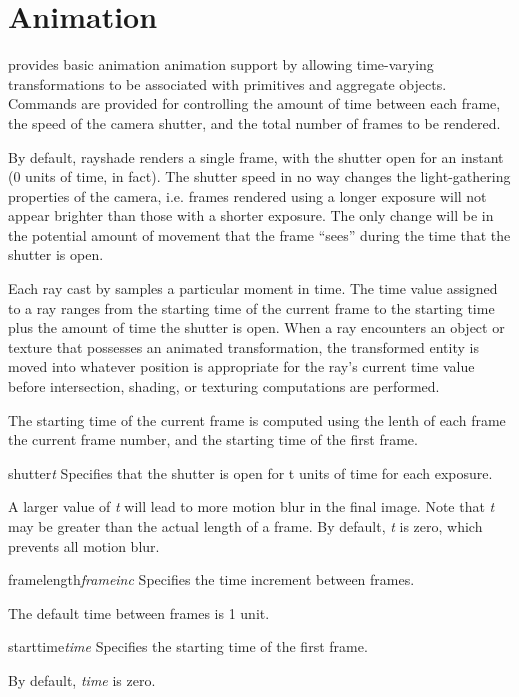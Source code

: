 \chapter{Animation}

\Rayshade provides basic animation animation support by
allowing time-varying
transformations to be associated with primitives and aggregate objects.
Commands are provided for controlling the amount of time between each
frame, the speed of the camera shutter, and the total number of frames
to be rendered.

By default, rayshade renders a single frame, with the shutter open for
an instant (0 units of time, in fact).  The shutter speed in no way
changes the light-gathering properties of the camera, i.e. frames
rendered using
a longer exposure will not appear brighter than those with a shorter
exposure.  The only change will be in the potential amount of movement
that the
frame ``sees'' during the time that the shutter is open.

Each ray cast by \rayshade samples a particular moment in time.
The time value assigned to a ray
ranges from the starting time of the current frame to the starting
time plus the amount of time the shutter is open.  When
a ray encounters an object or texture that possesses an animated
transformation, the transformed
entity is moved into whatever position is appropriate
for the ray's current time value before intersection, shading, or texturing
computations are performed.

The starting time of the current frame is computed using the
lenth of each frame
the current frame number, and the starting time of the first frame.

\begin{defkey}{shutter}{{\em t}}
	Specifies that the shutter is open for t units of
	time for each exposure.
\end{defkey}
A larger value of {\em t} will lead to more motion blur in the final
image.   Note that {\em t} may be greater than the actual length
of a frame.  By default, {\em t} is zero, which prevents all motion blur.

\begin{defkey}{framelength}{{\em frameinc}}
	Specifies the time increment between frames.
\end{defkey}
The default time between frames is 1 unit.

\begin{defkey}{starttime}{{\em time}}
	Specifies the starting time of the first frame.
\end{defkey}
By default, {\em time} is zero.

